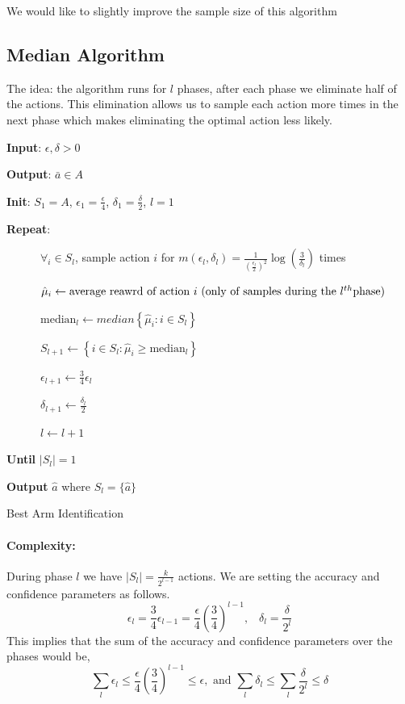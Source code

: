 We would like to slightly improve the sample size of this algorithm

\subsection{Median Algorithm}

The idea: the algorithm runs for $l$ phases, after each phase we
eliminate half of the actions. This elimination allows us to sample
each action more times in the next phase which makes eliminating the
optimal action less likely.

\begin{algorithm}
\textbf{Input}: $\epsilon,\delta>0$

\textbf{Output}: $\bar{a}\in A$

\textbf{Init}: $S_{1}=A$, $\epsilon_{1}=\frac{\epsilon}{4}$,
$\delta_{1}=\frac{\delta}{2}$, $l=1$

\textbf{Repeat}:

~~~~~~$\forall_{i}\in S_{l}$, sample action $i$ for $m(\epsilon_l,\delta_l)=\frac{1}{\left(\frac{\epsilon_{l}}{2}\right)^{2}}\log\left(\frac{3}{\delta_{l}}\right)$
times

~~~~~~$\hat{\mu}_{i}\leftarrow \text{average reawrd of action $i$ (only of samples during the \ensuremath{l^{th}}phase)}$

~~~~~~$\text{median}_{l}\leftarrow median\left\{ \hat{\mu}_{i}:i\in S_{l}\right\} $

~~~~~~$S_{l+1}\leftarrow\left\{ i\in S_{l}:\hat{\mu}_{i}\ge\text{median}_{l}\right\} $

~~~~~~$\epsilon_{l+1}\leftarrow\frac{3}{4}\epsilon_{l}$

~~~~~~$\delta_{l+1}\leftarrow\frac{\delta_{l}}{2}$

~~~~~~$l\leftarrow l+1$

\textbf{Until} $\left|S_{l}\right|=1$

\textbf{Output} $\hat{a}$ where $S_l=\{\hat{a}\}$


\caption{Best Arm Identification}
\end{algorithm}

\paragraph{Complexity:}

During phase $l$ we have $\left|S_{l}\right|=\frac{k}{2^{l-1}}$
actions. We are setting the accuracy and confidence parameters as follows.
\[
\epsilon_{l}=\frac{3}{4}\epsilon_{l-1}=\frac{\epsilon}{4}\left(\frac{3}{4}\right)^{l-1},\;\;\;\delta_{l}=\frac{\delta}{2^{l}}
\]
This implies that the sum of the accuracy and confidence parameters over the phases would be,
\[
 \sum_l\epsilon_{l}\le\frac{\epsilon}{4}\left(\frac{3}{4}\right)^{l-1}\le \epsilon, \text{ and } \sum_l\delta_{l}\le\sum_l \frac{\delta}{2^{l}} \le\delta
\]

